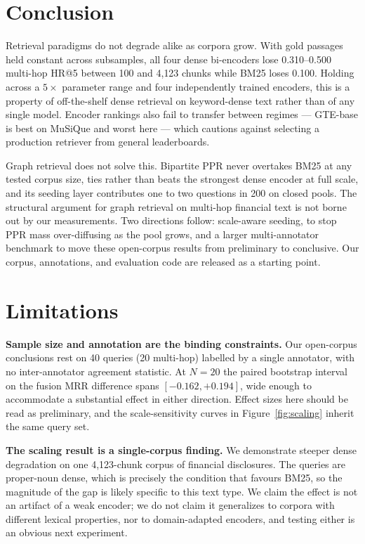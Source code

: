 \documentclass[runningheads]{llncs}
\begin{document}
\section{Conclusion}

Retrieval paradigms do not degrade alike as corpora grow. With gold passages held constant across subsamples, all four dense bi-encoders lose 0.310--0.500 multi-hop HR@5 between 100 and 4{,}123 chunks while BM25 loses 0.100. Holding across a $5\times$ parameter range and four independently trained encoders, this is a property of off-the-shelf dense retrieval on keyword-dense text rather than of any single model. Encoder rankings also fail to transfer between regimes --- GTE-base is best on MuSiQue and worst here --- which cautions against selecting a production retriever from general leaderboards.

Graph retrieval does not solve this. Bipartite PPR never overtakes BM25 at any tested corpus size, ties rather than beats the strongest dense encoder at full scale, and its seeding layer contributes one to two questions in 200 on closed pools. The structural argument for graph retrieval on multi-hop financial text is not borne out by our measurements. Two directions follow: scale-aware seeding, to stop PPR mass over-diffusing as the pool grows, and a larger multi-annotator benchmark to move these open-corpus results from preliminary to conclusive. Our corpus, annotations, and evaluation code are released as a starting point.

\section*{Limitations}

\textbf{Sample size and annotation are the binding constraints.} Our open-corpus conclusions rest on 40 queries (20 multi-hop) labelled by a single annotator, with no inter-annotator agreement statistic. At $N{=}20$ the paired bootstrap interval on the fusion MRR difference spans $[-0.162,+0.194]$, wide enough to accommodate a substantial effect in either direction. Effect sizes here should be read as preliminary, and the scale-sensitivity curves in Figure~\ref{fig:scaling} inherit the same query set.

\textbf{The scaling result is a single-corpus finding.} We demonstrate steeper dense degradation on one 4{,}123-chunk corpus of financial disclosures. The queries are proper-noun dense, which is precisely the condition that favours BM25, so the magnitude of the gap is likely specific to this text type. We claim the effect is not an artifact of a weak encoder; we do not claim it generalizes to corpora with different lexical properties, nor to domain-adapted encoders, and testing either is an obvious next experiment.
\end{document}
